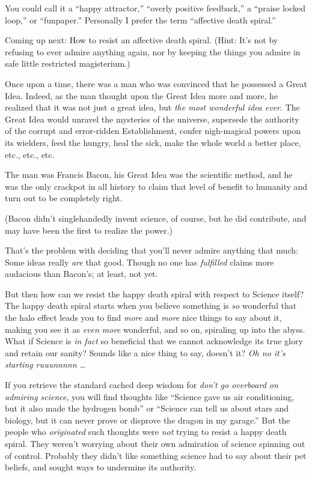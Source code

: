 {
 You could call it a ``happy
attractor,'' ``overly positive
feedback,'' a ``praise locked
loop,'' or
``funpaper.'' Personally I prefer
the term ``affective death
spiral.''}

{
 Coming up next: How to resist an affective death spiral. (Hint:
It's not by refusing to ever admire anything again, nor
by keeping the things you admire in safe little restricted
magisterium.)}

\myendsectiontext


{
 Once upon a time, there was a man who was convinced that he
possessed a Great Idea. Indeed, as the man thought upon the Great Idea
more and more, he realized that it was not just \textit{a} great idea,
but \textit{the most wonderful idea ever}. The Great Idea would unravel
the mysteries of the universe, supersede the authority of the corrupt
and error-ridden Establishment, confer nigh-magical powers upon its
wielders, feed the hungry, heal the sick, make the whole world a better
place, etc., etc., etc. }

{
 The man was Francis Bacon, his Great Idea was the scientific
method, and he was the only crackpot in all history to claim that level
of benefit to humanity and turn out to be completely right.}

{
 (Bacon didn't singlehandedly invent science, of
course, but he did contribute, and may have been the first to realize
the power.)}

{
 That's the problem with deciding that
you'll never admire anything that much: Some ideas
really \textit{are} that good. Though no one has \textit{fulfilled}
claims more audacious than Bacon's; at least, not yet.}

{
 But then how can we resist the happy death spiral with respect to
Science itself? The happy death spiral starts when you believe
something is \textit{so} wonderful that the halo effect leads you to
find \textit{more} and \textit{more} nice things to say about it,
making you see it as \textit{even more} wonderful, and so on, spiraling
up into the abyss. What if Science is \textit{in fact} so beneficial
that we cannot acknowledge its true glory and retain our sanity? Sounds
like a nice thing to say, doesn't it? \textit{Oh no
it's starting ruuunnnnn \ldots}}

{
 If you retrieve the standard cached deep wisdom for
\textit{don't go overboard on admiring science}, you
will find thoughts like ``Science gave us air
conditioning, but it also made the hydrogen bomb'' or
``Science can tell us about stars and biology, but it
can never prove or disprove the dragon in my
garage.'' But the people who \textit{originated} such
thoughts were \textit{not} trying to resist a happy death spiral. They
weren't worrying about their own admiration of science
spinning out of control. Probably they didn't like
something science had to say about their pet beliefs, and sought ways
to undermine its authority.}

